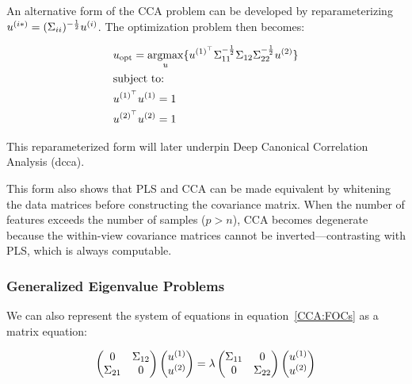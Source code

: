 An alternative form of the CCA problem can be developed by reparameterizing \(u^{(i*)}=(\Sigma_{ii})^{-\frac{1}{2}}u^{(i)}\). The optimization problem then becomes:

\begin{align}
     & u_{\text{opt}}=\underset{u}{\mathrm{argmax}}\{ u^{(1)^{\top}}\Sigma_{11}^{-\frac{1}{2}}\Sigma_{12}\Sigma_{22}^{-\frac{1}{2}}u^{(2)} \} \\
     & \text{subject to:} \notag \\
     & u^{(1)^{\top}}u^{(1)}=1 \notag \\
     & u^{(2)^{\top}}u^{(2)}=1 \notag
\end{align}

This reparameterized form will later underpin Deep Canonical Correlation Analysis (\acrshort{dcca}).

This form also shows that PLS and CCA can be made equivalent by whitening the data matrices before constructing the covariance matrix. When the number of features exceeds the number of samples (\(p>n\)), CCA becomes degenerate because the within-view covariance matrices cannot be inverted—contrasting with PLS, which is always computable.

\subsubsection{Generalized Eigenvalue Problems}

We can also represent the system of equations in equation~\ref{CCA:FOCs} as a matrix equation:

\begin{align}
    \begin{pmatrix}
        0 & \Sigma_{12} \\
        \Sigma_{21} & 0
    \end{pmatrix}
    \begin{pmatrix}
        u^{(1)} \\
        u^{(2)}
    \end{pmatrix}
    =
    \lambda
    \begin{pmatrix}
        \Sigma_{11} & 0 \\
        0                    & \Sigma_{22}
    \end{pmatrix}
    \begin{pmatrix}
        u^{(1)} \\
        u^{(2)}
    \end{pmatrix}
\end{align}

